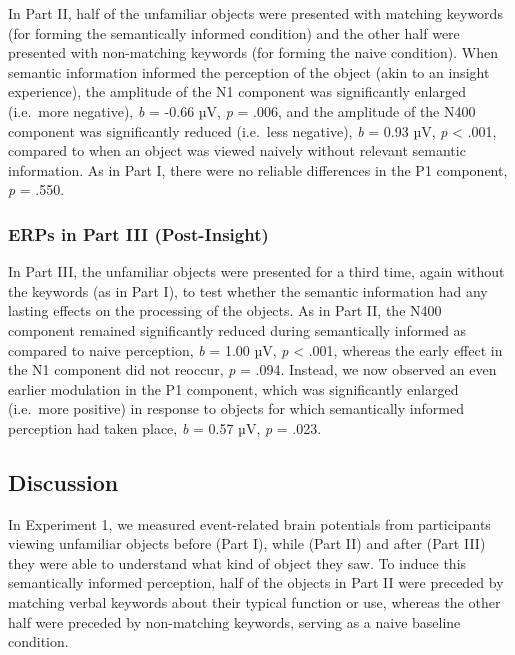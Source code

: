 \documentclass[
  english,
  man,11pt,floatsintext]{apa7}
\begin{document}
In Part II, half of the unfamiliar objects were presented with matching keywords (for forming the semantically informed condition) and the other half were presented with non-matching keywords (for forming the naive condition). When semantic information informed the perception of the object (akin to an insight experience), the amplitude of the N1 component was significantly enlarged (i.e.~more negative), \emph{b} = -0.66 µV, \emph{p} = .006, and the amplitude of the N400 component was significantly reduced (i.e.~less negative), \emph{b} = 0.93 µV, \emph{p} \textless{} .001, compared to when an object was viewed naively without relevant semantic information. As in Part I, there were no reliable differences in the P1 component, \emph{p} = .550.

\hypertarget{erps-in-part-iii-post-insight}{%
\subsubsection{ERPs in Part III (Post-Insight)}\label{erps-in-part-iii-post-insight}}

In Part III, the unfamiliar objects were presented for a third time, again without the keywords (as in Part I), to test whether the semantic information had any lasting effects on the processing of the objects. As in Part II, the N400 component remained significantly reduced during semantically informed as compared to naive perception, \emph{b} = 1.00 µV, \emph{p} \textless{} .001, whereas the early effect in the N1 component did not reoccur, \emph{p} = .094. Instead, we now observed an even earlier modulation in the P1 component, which was significantly enlarged (i.e.~more positive) in response to objects for which semantically informed perception had taken place, \emph{b} = 0.57 µV, \emph{p} = .023.

\hypertarget{discussion}{%
\subsection{Discussion}\label{discussion}}

In Experiment 1, we measured event-related brain potentials from participants viewing unfamiliar objects before (Part I), while (Part II) and after (Part III) they were able to understand what kind of object they saw. To induce this semantically informed perception, half of the objects in Part II were preceded by matching verbal keywords about their typical function or use, whereas the other half were preceded by non-matching keywords, serving as a naive baseline condition.
\end{document}
